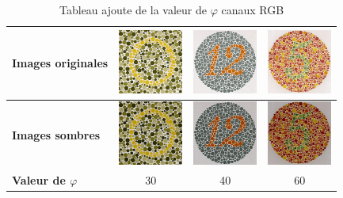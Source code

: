 \documentclass[a4paper,11pt]{article}
\begin{document}
\begin{table}[H]
  \begin{center}
  
    \begin{tabular}{|l||c|c|c|}
    
      \hline
    
      \bf Images originales &
      \includegraphics[width=80px]{images/it1_72pp.png} & 
      \includegraphics[width=80px]{images/it2_72pp.png} & 
      \includegraphics[width=80px]{images/it3_72pp.png} \\
      
      \hline
       
      \bf Images sombres &
      \includegraphics[width=80px]{images/it1_72pp_sombre.png} &
      \includegraphics[width=80px]{images/it2_72pp_sombre.png} &
      \includegraphics[width=80px]{images/it3_72pp_sombre.png}\\
      
      \hline
      
      \bf Valeur de $\varphi$ &
      30 &
      40 &
      60\\
      
      \hline
    \end{tabular}
    
    \caption{Tableau ajoute de la valeur de $\varphi$ canaux RGB}
    \label{tab:}
    
  \end{center}
\end{table}
\end{document}
